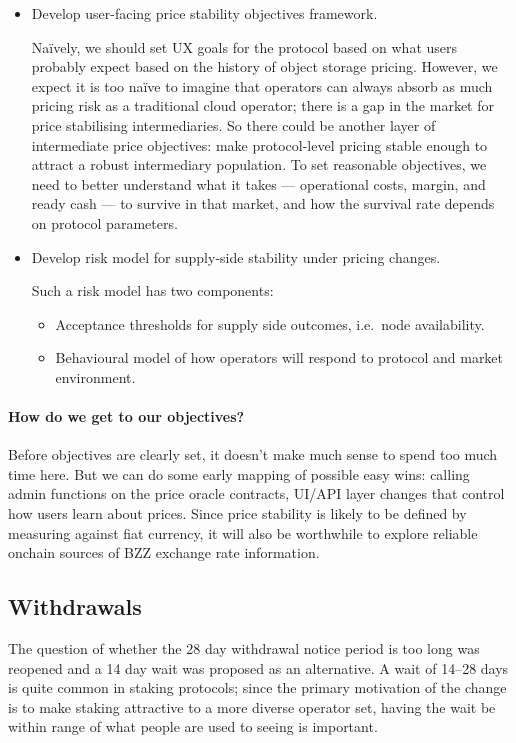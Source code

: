 \begin{itemize}
\item 
  Develop user-facing price stability objectives framework. 

  Na\"ively, we should set UX goals for the protocol based on what users probably expect based on the history of object storage pricing.
  However, we expect it is too na\"ive to imagine that operators can always absorb as much pricing risk as a traditional cloud operator; there is a gap in the market for price stabilising intermediaries.
  So there could be another layer of intermediate price objectives: make protocol-level pricing stable enough to attract a robust intermediary population.
  To set reasonable objectives, we need to better understand what it takes — operational costs, margin, and ready cash — to survive in that market, and how the survival rate depends on protocol parameters.

\item 
  Develop risk model for supply-side stability under pricing changes.

  Such a risk model has two components:
  \begin{itemize}
    \item Acceptance thresholds for supply side outcomes, i.e.~node availability.
    \item Behavioural model of how operators will respond to protocol and market environment.
  \end{itemize}
\end{itemize}

\paragraph{How do we get to our objectives?}

Before objectives are clearly set, it doesn't make much sense to spend too much time here.
%
But we can do some early mapping of possible easy wins: calling admin functions on the price oracle contracts, UI/API layer changes that control how users learn about prices.
%
Since price stability is likely to be defined by measuring against fiat currency, it will also be worthwhile to explore reliable onchain sources of BZZ exchange rate information.

\subsection*{Withdrawals}

The question of whether the 28 day withdrawal notice period is too long was reopened and a 14 day wait was proposed as an alternative. 
%
A wait of 14–28 days is quite common in staking protocols; since the primary motivation of the change is to make staking attractive to a more diverse operator set, having the wait be within range of what people are used to seeing is important.

